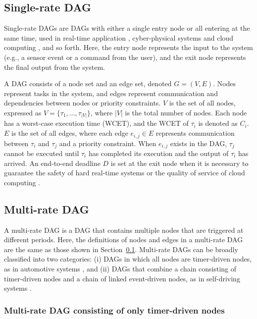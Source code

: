 \subsection{Single-rate DAG}
\label{ssec: single_rate_dag}

Single-rate DAGs are DAGs with either a single entry node or all entering at the same time, used in real-time application \cite{zhao2020dag}, cyber-physical systems \cite{senapati2021hmds} and cloud computing \cite{kaur2020deep}, and so forth.
Here, the entry node represents the input to the system (e.g., a sensor event or a command from the user), and the exit node represents the final output from the system.

A DAG consists of a node set and an edge set, denoted $G = (V, E)$.
Nodes represent tasks in the system, and edges represent communication and dependencies between nodes or priority constraints.
$V$ is the set of all nodes, expressed as $V = \{\tau_1, ..., \tau_{|V|}\}$, where $|V|$ is the total number of nodes.
Each node has a worst-case execution time (WCET), and the WCET of $\tau_i$ is denoted as $C_i$.
$E$ is the set of all edges, where each edge $e_{i,j} \in E$ represents communication between $\tau_i$ and $\tau_j$ and a priority constraint.
When $e_{i,j}$ exists in the DAG, $\tau_j$ cannot be executed until $\tau_i$ has completed its execution and the output of $\tau_i$ has arrived.
An end-to-end deadline $D$ is set at the exit node when it is necessary to guarantee the safety of hard real-time systems \cite{yano2021work} or the quality of service of cloud computing \cite{zhang2020efficient}.


\subsection{Multi-rate DAG}
\label{ssec: multi_rate_dag}

A multi-rate DAG is a DAG that contains multiple nodes that are triggered at different periods.
Here, the definitions of nodes and edges in a multi-rate DAG are the same as those shown in Section~\ref{ssec: single_rate_dag}.
Multi-rate DAGs can be broadly classified into two categories: (i) DAGs in which all nodes are timer-driven nodes, as in automotive systems \cite{kordon2020evaluation, verucchi2020latency}, and (ii) DAGs that combine a chain consisting of timer-driven nodes and a chain of linked event-driven nodes, as in self-driving systems \cite{choi2021picas, tang2020response}.


\subsubsection{Multi-rate DAG consisting of only timer-driven nodes}
\label{sssec: dag_only_timer}

